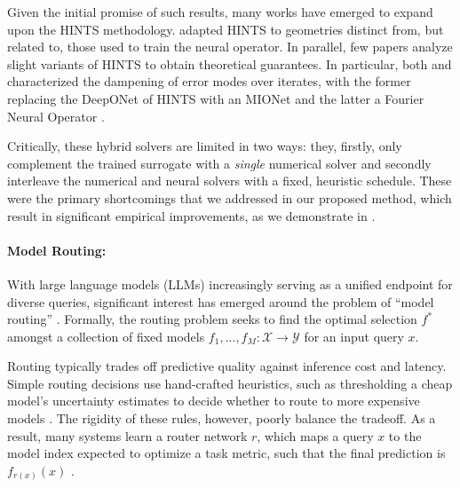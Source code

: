 \documentclass{article} %
\begin{document}
Given the initial promise of such results, many works have emerged to expand upon the HINTS methodology. \citet{kahana2023geometry} adapted HINTS to geometries distinct from, but related to, those used to train the neural operator. In parallel, few papers analyze slight variants of HINTS to obtain theoretical guarantees.
In particular, both \citet{hu2025hybrid} and \citet{cui2022fourier} characterized the dampening of error modes over iterates, with the former replacing the DeepONet of HINTS with an MIONet \citep{jin2022mionet} and the latter a Fourier Neural Operator \citep{li2020fourier}.

Critically, these hybrid solvers are limited in two ways: they, firstly, only complement the trained surrogate with a \textit{single} numerical solver 
and secondly interleave the numerical and neural solvers with a fixed, heuristic schedule. These were the primary shortcomings that we addressed in our proposed method, which result in significant empirical improvements, as we demonstrate in .

\paragraph{Model Routing:} With large language models (LLMs) increasingly serving as a unified endpoint for diverse queries, significant interest has emerged around the problem of ``model routing'' \citep{shnitzer2023large,hu2024routerbench,ding2024hybrid,huang2025routereval}. Formally, the routing problem seeks to find the optimal selection $f^{*}$ amongst a collection of fixed models $f_{1},...,f_{M} : \mathcal{X}\to\mathcal{Y}$ for an input query $x$. 

Routing typically trades off predictive quality against inference cost and latency. Simple routing decisions use hand-crafted heuristics, such as thresholding a cheap model's uncertainty estimates to decide whether to route to more expensive models \cite{chuang2025confident,chuang2024learning}. The rigidity of these rules, however, poorly balance the tradeoff. As a result, many systems learn a router network $r$, which maps a query $x$ to the model index expected to optimize a task metric, such that the final prediction is $f_{r(x)}(x)$ \cite{mohammadshahi2024routoo,hari2023tryage,vsakota2024fly}.
\end{document}
